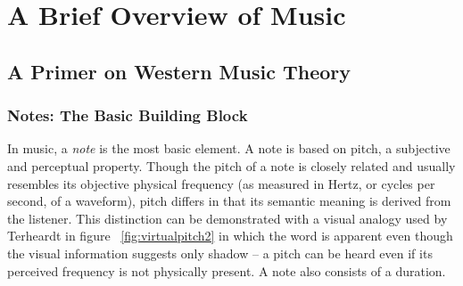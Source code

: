 \chapter{A Brief Overview of Music}

\section{A Primer on Western Music Theory}

\subsection{Notes: The Basic Building Block}

In music, a \textit{note} is the most basic element. A note is based on pitch, a subjective and perceptual property. Though the pitch of a note is closely related and usually resembles its objective physical frequency (as measured in Hertz, or cycles per second, of a waveform), pitch differs in that its semantic meaning is derived from the listener. This distinction can be demonstrated with a visual analogy used by Terheardt in figure ~\ref{fig:virtualpitch2} in which the word  is apparent even though the visual information suggests only shadow -- a pitch can be heard even if its perceived frequency is not physically present. A note also consists of a duration.